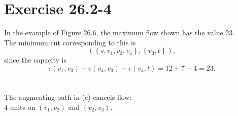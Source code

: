 \section{Exercise 26.2-4}
In the example of Figure 26.6, the maximum flow shown has the value 23.
\\
The minimum cut corresponding to this is
$$
(\left\{s,v_1,v_2,v_4\right\}, \left\{v_3,t\right\}),
$$
since the capacity is
$$
c(v_1,v_3) + c(v_4,v_3) + c(v_4,t) = 12+7+4 = 23.
$$
\\
\\
The augmenting path in (c) cancels flow:
\\
4 units on $(v_1, v_2)$ and $(v_2,v_3)$.